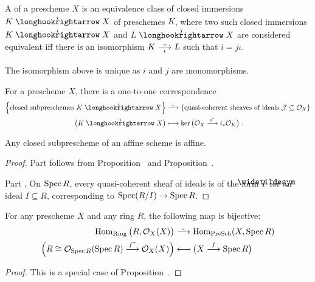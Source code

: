 \documentclass[a4paper,parskip=half,numbers=enddot, DIV=12]{scrreprt}
\begin{document}
\begin{defi}
	A  of a prescheme $X$ is an equivalence class of closed immersions $K\monomorphism[i]X$ of preschemes $K$, where two such closed immersions $K\monomorphism[i]X$ and $L\monomorphism[j]X$ are considered equivalent iff there is an isomorphism $K\isomorphism[\iota]L$ such that $i=j\iota$.
\end{defi}
\begin{rem}
	The isomorphism above is unique as $i$ and $j$ are monomorphisms.
\end{rem}
\begin{cor}
	\begin{alphanumerate}
		\item {} For a prescheme $X$, there is a one-to-one correspondence 
		\begin{align*}
			\left\{\text{closed subpreschemes }K\monomorphism[i]X\right\}&\isomorphism\left\{\text{quasi-coherent sheaves of ideals }\Jj\subseteq\Oo_X\right\}\\
			\big(K\monomorphism[i]X\big)&\longmapsto\ker\big(\Oo_X\morphism[i^*]i_*\Oo_K\big)\;.
		\end{align*}
		\item Any closed subprescheme of an affine scheme is affine.
	\end{alphanumerate}
\end{cor}
\begin{proof}
	Part  follows from Proposition~ and Proposition~.
	
	Part . On $\operatorname{Spec} R$, every quasi-coherent sheaf of ideals is of the form $\snake{I}$ for an ideal $I\subseteq R$, corresponding to $\Spec(R/I)\morphism\Spec R$.
\end{proof}
\begin{cor}
	For any prescheme $X$ and any ring $R$, the following map is bijective:
	\begin{align*}
		\Hom_{\cat{Ring}}\big(R,\Oo_X(X)\big)&\isomorphism\Hom_{\cat{PreSch}}(X,\Spec R)\\
		\Big(R\cong \Oo_{\Spec R}(\Spec R)\morphism[f^*]\Oo_X(X)\Big)&\longmapsfrom \big(X\morphism[f]\Spec R\big)
	\end{align*}
\end{cor}
\begin{proof}
	This is a special case of Proposition~.
\end{proof}
\end{document}
